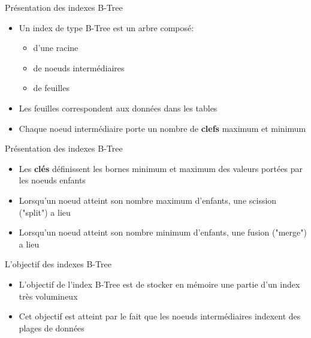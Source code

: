 \begin{frame}[fragile]{Présentation des indexes B-Tree}

   \begin{itemize}
      \item Un index de type B-Tree est un arbre composé:
      \begin{itemize}
         \item d'une racine
         \item de noeuds intermédiaires
         \item de feuilles
      \end{itemize}
      \item Les feuilles correspondent aux données dans les tables
      \item Chaque noeud intermédiaire porte un nombre de \textbf{clefs} maximum et minimum

   \end{itemize}

\begin{toile}
\end{toile}

\end{frame}


\begin{frame}[fragile]{Présentation des indexes B-Tree}

   \begin{itemize}
      \item Les \textbf{clés} définissent les bornes minimum et maximum des valeurs portées par les noeuds enfants
      \item Lorsqu'un noeud atteint son nombre maximum d'enfants, une scission ("split") a lieu
      \item Lorsqu'un noeud atteint son nombre minimum d'enfants, une fusion ("merge") a lieu

   \end{itemize}

\end{frame}


\begin{frame}[fragile]{L'objectif des indexes B-Tree}

   \begin{itemize}
      \item L'objectif de l'index B-Tree est de stocker en mémoire une partie d'un index très volumineux
      \item Cet objectif est atteint par le fait que les noeuds intermédiaires indexent des plages de données
   \end{itemize}

\end{frame}

